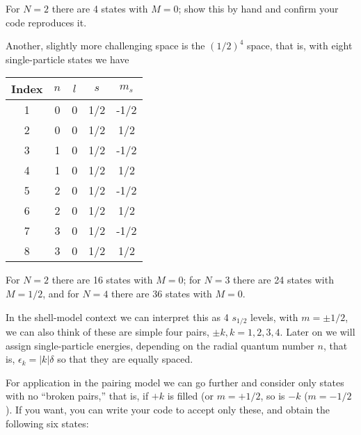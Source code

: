 \documentclass[graybox,sectrefs,envcountresetchap,open=right]{svmonodo}
\begin{document}
\noindent
For $N=2$ there are 4 states with $M=0$; show this by hand and confirm your code reproduces it. 


Another, slightly more challenging space is the $(1/2)^4$ space, that is, 
with eight  single-particle states we have



{\small   %

\vspace{4mm}

\begin{tabular}{ccccc}
\hline
\multicolumn{1}{c}{ Index } & \multicolumn{1}{c}{ $n$ } & \multicolumn{1}{c}{ $l$ } & \multicolumn{1}{c}{ $s$ } & \multicolumn{1}{c}{ $m_s$ } \\
\hline
1     & 0   & 0   & 1/2 & -1/2  \\
2     & 0   & 0   & 1/2 & 1/2   \\
3     & 1   & 0   & 1/2 & -1/2  \\
4     & 1   & 0   & 1/2 & 1/2   \\
5     & 2   & 0   & 1/2 & -1/2  \\
6     & 2   & 0   & 1/2 & 1/2   \\
7     & 3   & 0   & 1/2 & -1/2  \\
8     & 3   & 0   & 1/2 & 1/2   \\
\hline
\end{tabular}

\vspace{4mm}

}


\noindent
For $N=2$ there are 16 states with $M=0$; for $N=3$ there are 24 states with $M=1/2$, and for 
$N=4$ there are 36 states with $M=0$. 


In the shell-model context we can interpret this as 4 $s_{1/2}$ levels, with $m = \pm 1/2$, we can also think of these are simple four pairs,  $\pm k, k = 1,2,3,4$. Later on we will 
assign single-particle energies,  depending on the radial quantum number $n$, that is, 
$\epsilon_k = |k| \delta$ so that they are equally spaced.


For application in the pairing model we can go further and consider only states with 
no ``broken pairs,'' that is, if $+k$ is filled (or $m = +1/2$, so is $-k$ ($m=-1/2$). 
If you want, you can write your code to accept only these, and obtain the following 
six states:
\end{document}
